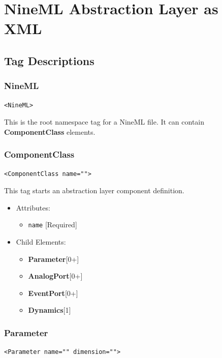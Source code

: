 \documentclass{article}
\newcommand{\ComponentClass}{{\bf{ComponentClass}}\xspace}
\newcommand{\Dynamics}{{\bf{Dynamics}}\xspace}
\newcommand{\AnalogPort}{{\bf{AnalogPort}}\xspace}
\newcommand{\EventPort}{{\bf{EventPort}}\xspace}
\newcommand{\Parameter}{{\bf{Parameter}}\xspace}
\begin{document}
\section{NineML Abstraction Layer as XML}

\subsection{Tag Descriptions}

\subsubsection{NineML}
%
\begin{lstlisting}
<NineML>
\end{lstlisting}

This is the root namespace tag for a NineML file. It can contain
\ComponentClass elements.

\subsubsection{ComponentClass}
%
\begin{lstlisting}
<ComponentClass name="">
\end{lstlisting}

This tag starts an abstraction layer component definition.

\begin{itemize}
\item Attributes:
%
\begin{itemize}
\item \verb|name| {[}Required{]}
\end{itemize}

\item Child Elements:
%
\begin{itemize}
\item \Parameter {[}0+{]}
\item \AnalogPort{[}0+{]}
\item \EventPort {[}0+{]}
\item \Dynamics  {[}1{]}
\end{itemize}

\end{itemize}

\subsubsection{Parameter}
%
\begin{lstlisting}
<Parameter name="" dimension="">
\end{lstlisting}
\end{document}
